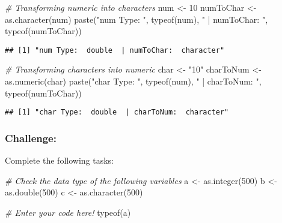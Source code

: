 \documentclass[
]{article}
\newenvironment{Shaded}{\begin{snugshade}}{\end{snugshade}}
\newcommand{\CommentTok}[1]{\textcolor[rgb]{0.56,0.35,0.01}{\textit{#1}}}
\newcommand{\DecValTok}[1]{\textcolor[rgb]{0.00,0.00,0.81}{#1}}
\newcommand{\FunctionTok}[1]{\textcolor[rgb]{0.00,0.00,0.00}{#1}}
\newcommand{\NormalTok}[1]{#1}
\newcommand{\OtherTok}[1]{\textcolor[rgb]{0.56,0.35,0.01}{#1}}
\newcommand{\StringTok}[1]{\textcolor[rgb]{0.31,0.60,0.02}{#1}}
\begin{document}
\begin{Shaded}
\begin{Highlighting}[]
\CommentTok{\# Transforming numeric into characters}
\NormalTok{num }\OtherTok{\textless{}{-}} \DecValTok{10}
\NormalTok{numToChar }\OtherTok{\textless{}{-}} \FunctionTok{as.character}\NormalTok{(num)}
\FunctionTok{paste}\NormalTok{(}\StringTok{"num Type: "}\NormalTok{, }\FunctionTok{typeof}\NormalTok{(num), }\StringTok{" | numToChar: "}\NormalTok{, }\FunctionTok{typeof}\NormalTok{(numToChar))}
\end{Highlighting}
\end{Shaded}

\begin{verbatim}
## [1] "num Type:  double  | numToChar:  character"
\end{verbatim}

\begin{Shaded}
\begin{Highlighting}[]
\CommentTok{\# Transforming characters into numeric}
\NormalTok{char }\OtherTok{\textless{}{-}} \StringTok{"10"}
\NormalTok{charToNum }\OtherTok{\textless{}{-}} \FunctionTok{as.numeric}\NormalTok{(char)}
\FunctionTok{paste}\NormalTok{(}\StringTok{"char Type: "}\NormalTok{, }\FunctionTok{typeof}\NormalTok{(num), }\StringTok{" | charToNum: "}\NormalTok{, }\FunctionTok{typeof}\NormalTok{(numToChar))}
\end{Highlighting}
\end{Shaded}

\begin{verbatim}
## [1] "char Type:  double  | charToNum:  character"
\end{verbatim}

\hypertarget{challenge}{%
\subsubsection{Challenge:}\label{challenge}}

Complete the following tasks:

\begin{Shaded}
\begin{Highlighting}[]
\CommentTok{\# Check the data type of the following variables}
\NormalTok{a }\OtherTok{\textless{}{-}} \FunctionTok{as.integer}\NormalTok{(}\DecValTok{500}\NormalTok{)}
\NormalTok{b }\OtherTok{\textless{}{-}} \FunctionTok{as.double}\NormalTok{(}\DecValTok{500}\NormalTok{)}
\NormalTok{c }\OtherTok{\textless{}{-}} \FunctionTok{as.character}\NormalTok{(}\DecValTok{500}\NormalTok{)}

\CommentTok{\# Enter your code here!}
\FunctionTok{typeof}\NormalTok{(a)}
\end{Highlighting}
\end{Shaded}
\end{document}
